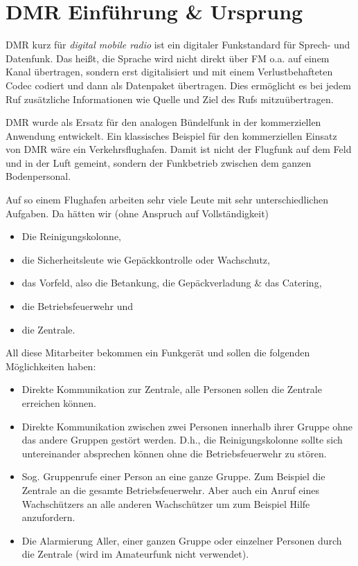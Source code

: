 \section{DMR Einführung \& Ursprung} \label{sec:ursprung}
DMR kurz für \emph{digital mobile radio} ist ein digitaler Funkstandard für Sprech- und Datenfunk. Das heißt, die Sprache wird nicht direkt über FM o.a. auf einem Kanal übertragen, sondern erst digitalisiert und mit einem Verlustbehafteten Codec codiert und dann als Datenpaket übertragen. Dies ermöglicht es bei jedem Ruf zusätzliche Informationen wie Quelle und Ziel des Rufs mitzuübertragen.

DMR wurde als Ersatz für den analogen Bündelfunk in der kommerziellen Anwendung entwickelt. Ein klassisches Beispiel für den kommerziellen Einsatz von DMR wäre ein Verkehrsflughafen. Damit ist nicht der Flugfunk auf dem Feld und in der Luft gemeint, sondern der Funkbetrieb zwischen dem ganzen Bodenpersonal. 

Auf so einem Flughafen arbeiten sehr viele Leute mit sehr unterschiedlichen Aufgaben. Da hätten wir (ohne Anspruch auf Vollständigkeit)
\begin{itemize}
 \item Die Reinigungskolonne,
 \item die Sicherheitsleute wie Gepäckkontrolle oder Wachschutz,
 \item das Vorfeld, also die Betankung, die Gepäckverladung \& das Catering, 
 \item die Betriebsfeuerwehr und
 \item die Zentrale.
\end{itemize}

All diese Mitarbeiter bekommen ein Funkgerät und sollen die folgenden Möglichkeiten haben:
\begin{itemize}
 \item Direkte Kommunikation zur Zentrale, alle Personen sollen die Zentrale erreichen können.
 \item Direkte Kommunikation zwischen zwei Personen innerhalb ihrer Gruppe ohne das andere Gruppen gestört werden. D.h., die Reinigungskolonne sollte sich untereinander absprechen können ohne die Betriebsfeuerwehr zu stören.
 \item Sog. Gruppenrufe einer Person an eine ganze Gruppe. Zum Beispiel die Zentrale an die gesamte Betriebsfeuerwehr. Aber auch ein Anruf eines Wachschützers an alle anderen Wachschützer um zum Beispiel Hilfe anzufordern. 
 \item Die Alarmierung Aller, einer ganzen Gruppe oder einzelner Personen durch die Zentrale (wird im Amateurfunk nicht verwendet).
\end{itemize}
 
